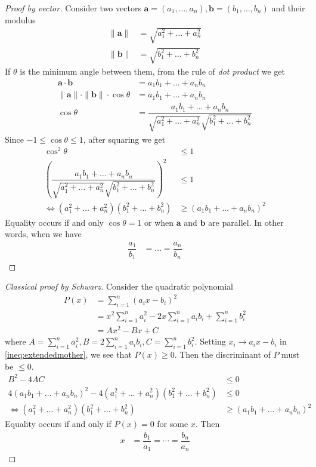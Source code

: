 \documentclass{subfile}
\begin{document}
		\begin{proof}[Proof by vector]
			Consider two vectors $\mathbf{a}=(a_1,\ldots,a_n),\mathbf{b}=(b_1,\ldots,b_n)$ and their modulus
				\begin{align*}
					\|\mathbf{a}\|
						& = \sqrt{a_1^2+\ldots+a_n^2}\\
					\|\mathbf{b}\|
						& = \sqrt{b_1^2+\ldots+b_n^2}
				\end{align*}
			If $\theta$ is the minimum angle between them, from the rule of \textit{dot product} we get
				\begin{align*}
					\mathbf{a}\cdot\mathbf{b}
						& = a_1b_1+\ldots+a_nb_n\\
					\|\mathbf{a}\|\cdot\|\mathbf{b}\|\cdot\cos\theta
						& = a_1b_1+\ldots+a_nb_n\\
					\cos{\theta}
						& = \dfrac{a_1b_1+\ldots+a_nb_n}{\sqrt{a_1^2+\ldots+a_n^2}\sqrt{b_1^2+\ldots+b_n^2}}
				\end{align*}
			Since $-1\leq\cos\theta\leq1$, after squaring we get
				\begin{align*}
					\cos^2\theta
						& \leq1\\
					\left(\dfrac{a_1b_1+\ldots+a_nb_n}{\sqrt{a_1^2+\ldots+a_n^2}\sqrt{b_1^2+\ldots+b_n^2}}\right)^2
						& \leq1\\
					\iff (a_1^2+\ldots+a_n^2)(b_1^2+\ldots+b_n^2)
						& \geq(a_1b_1+\ldots+a_nb_n)^2
				\end{align*}
			Equality occurs if and only $\cos\theta=1$ or when $\mathbf{a}$ and $\mathbf{b}$ are parallel. In other words, when we have
				\begin{align*}
					\dfrac{a_1}{b_1}& = \ldots=\dfrac{a_n}{b_n}
				\end{align*}
		\end{proof}
	
		\begin{proof}[Classical proof by Schwarz]
			Consider the quadratic polynomial
				\begin{align*}
					P(x)
						& = \sum_{i=1}^n(a_ix-b_i)^2\\
						& = x^2\sum_{i=1}^na_i^2-2x\sum_{i=1}^na_ib_i+\sum_{i=1}^nb_i^2\\
						& = Ax^2-Bx+C
				\end{align*}
			where $A=\sum_{i=1}^na_i^2,B=2\sum_{i=1}^na_ib_i,C=\sum_{i=1}^nb_i^2$. Setting $x_i\to a_ix-b_i$ in \ref{ineq:extendedmother}, we see that $P(x)\geq0$. Then the discriminant of $P$ must be $\leq0$.
				\begin{align*}
					B^2-4AC
						& \leq0\\
					4(a_1b_1+\ldots+a_nb_n)^2-4(a_1^2+\ldots+a_n^2)(b_1^2+\ldots+b_n^2)
						& \leq0\\
					\iff (a_1^2+\ldots+a_n^2)(b_1^2+\ldots+b_n^2)
						& \geq(a_1b_1+\ldots+a_nb_n)^2
				\end{align*}
			Equality occurs if and only if $P(x)=0$ for some $x$. Then
				\begin{align*}
					x
						& = \dfrac{b_1}{a_1}=\cdots=\dfrac{b_n}{a_n}
				\end{align*}
		\end{proof}
	
\end{document}
